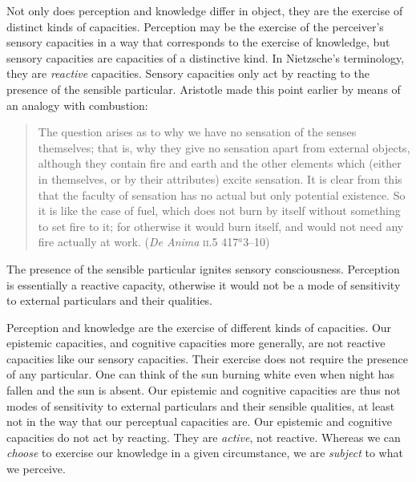 Not only does perception and knowledge differ in object, they are the exercise of distinct kinds of capacities. Perception may be the exercise of the perceiver's sensory capacities in a way that corresponds to the exercise of knowledge, but sensory capacities are capacities of a distinctive kind. In Nietzsche's \citeyearpar{Nietzsche1887On-the-Genealog} terminology, they are \emph{reactive} capacities. Sensory capacities only act by reacting to the presence of the sensible particular. Aristotle made this point earlier by means of an analogy with combustion:
\begin{quote}
	The question arises as to why we have no sensation of the senses themselves; that is, why they give no sensation apart from external objects, although they contain fire and earth and the other elements which (either in themselves, or by their attributes) excite sensation. It is clear from this that the faculty of sensation has no actual but only potential existence. So it is like the case of fuel, which does not burn by itself without something to set fire to it; for otherwise it would burn itself, and would not need any fire actually at work. (\emph{De Anima} \textsc{ii}.5 417\( ^{a} \)3--10)
\end{quote}
The presence of the sensible particular ignites sensory consciousness. Perception is essentially a reactive capacity, otherwise it would not be a mode of sensitivity to external particulars and their qualities.

Perception and knowledge are the exercise of different kinds of capacities. Our epistemic capacities, and cognitive capacities more generally, are not reactive capacities like our sensory capacities. Their exercise does not require the presence of any particular. One can think of the sun burning white even when night has fallen and the sun is absent. Our epistemic and cognitive capacities are thus not modes of sensitivity to external particulars and their sensible qualities, at least not in the way that our perceptual capacities are. Our epistemic and cognitive capacities do not act by reacting. They are \emph{active}, not reactive. Whereas we can \emph{choose} to exercise our knowledge in a given circumstance, we are \emph{subject} to what we perceive. 

